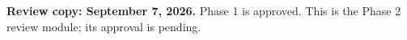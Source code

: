 \documentclass[11pt]{article}
\begin{document}
\noindent\textbf{Review copy: September 7, 2026.} Phase 1 is approved.
This is the Phase 2 review module; its approval is pending.
\setcounter{section}{1}

\end{document}
